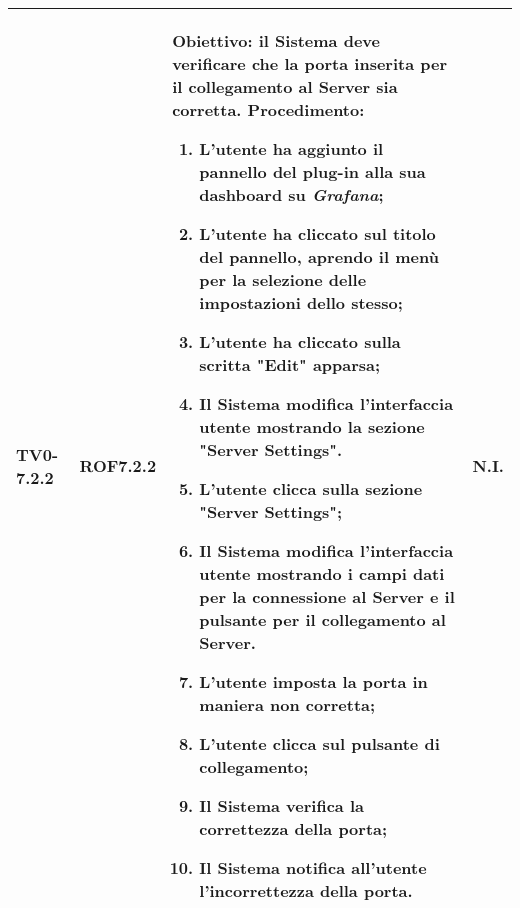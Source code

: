 \begin{longtable}{|C{.15\textwidth}|C{.13\textwidth}|m{.52\textwidth}|C{.08\textwidth}|}
TV0-7.2.2 & ROF7.2.2 &
	\textbf{Obiettivo}: il Sistema deve verificare che la porta inserita per il collegamento al Server sia corretta. \newline
	\textbf{Procedimento}:
	\begin{enumerate}
		\item L'utente ha aggiunto il pannello del plug-in alla sua dashboard su \textit{Grafana};
		\item L'utente ha cliccato sul titolo del pannello, aprendo il menù per la selezione delle impostazioni dello stesso;
		\item L'utente ha cliccato sulla scritta "Edit" apparsa;
		\item Il Sistema modifica l'interfaccia utente mostrando la sezione "Server Settings".
		\item L'utente clicca sulla sezione "Server Settings";
		\item Il Sistema modifica l'interfaccia utente mostrando i campi dati per la connessione al Server e il pulsante per il collegamento al Server.
		\item L'utente imposta la porta in maniera non corretta;
		\item L'utente clicca sul pulsante di collegamento;
		\item Il Sistema verifica la correttezza della porta;
		\item Il Sistema notifica all'utente l'incorrettezza della porta.
	\end{enumerate}
	& N.I. \\
\hline


\end{longtable}
